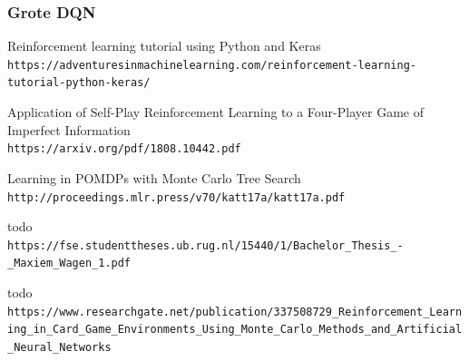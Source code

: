 \documentclass[11pt]{article}
\begin{document}
\subsubsection{Grote DQN}

\newpage
\begin{thebibliography}{9}
Reinforcement learning tutorial using Python and Keras 
\\\texttt{https://adventuresinmachinelearning.com/reinforcement-learning-tutorial-python-keras/}

Application of Self-Play Reinforcement Learning to a Four-Player Game of Imperfect Information
\\\texttt{https://arxiv.org/pdf/1808.10442.pdf}

Learning in POMDPs with Monte Carlo Tree Search
\\\texttt{http://proceedings.mlr.press/v70/katt17a/katt17a.pdf}

todo
\\\texttt{https://fse.studenttheses.ub.rug.nl/15440/1/Bachelor_Thesis_-_Maxiem_Wagen_1.pdf}

todo
\\\texttt{https://www.researchgate.net/publication/337508729_Reinforcement_Learning_in_Card_Game_Environments_Using_Monte_Carlo_Methods_and_Artificial_Neural_Networks}
\end{thebibliography}
\end{document}
